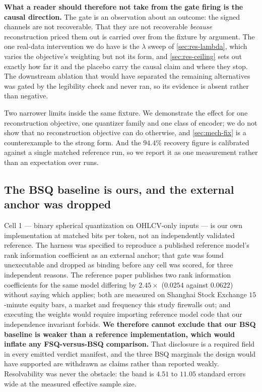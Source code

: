 \textbf{What a reader should therefore not take from the gate firing is the causal direction.} The
gate is an observation about an outcome: the signed channels are not recoverable. That they are not
recoverable \emph{because} reconstruction priced them out is carried over from the fixture by
argument. The one real-data intervention we do have is the $\lambda$ sweep of
\cref{sec:res-lambda}, which varies the objective's weighting but not its form, and
\cref{sec:res-ceiling} sets out exactly how far it and the placebo carry the causal claim and where
they stop. The downstream ablation that would have separated the remaining alternatives was gated
by the legibility check and never ran, so its evidence is absent rather than negative.

Two narrower limits inside the same fixture. We demonstrate the effect for one reconstruction
objective, one quantizer family and one class of encoder; we do not show that no reconstruction
objective can do otherwise, and \cref{sec:mech-fix} is a counterexample to the strong form. And the
$94.4\%$ recovery figure is calibrated against a single matched reference run, so we report it as
one measurement rather than an expectation over runs.

\subsection{The BSQ baseline is ours, and the external anchor was dropped}
\label{sec:lim-baseline}

Cell 1 --- binary spherical quantization on OHLCV-only inputs --- is our own implementation at
matched bits per token, not an independently validated reference. The harness was specified to
reproduce a published reference model's rank information coefficient as an external anchor; that
gate was found unexecutable and dropped as binding before any cell was scored, for three
independent reasons. The reference paper publishes two rank information coefficients for the same
model differing by $2.45\times$ ($0.0254$ against $0.0622$) without saying which applies; both are
measured on Shanghai Stock Exchange $15$-minute equity bars, a market and frequency this study
firewalls out; and executing the weights would require importing reference model code that our
independence invariant forbids. \textbf{We therefore cannot exclude that our BSQ baseline is
weaker than a reference implementation, which would inflate any FSQ-versus-BSQ comparison.} That
disclosure is a required field in every emitted verdict manifest, and the three BSQ marginals the
design would have supported are withdrawn as claims rather than reported weakly. Resolvability was
never the obstacle: the band is $4.51$ to $11.05$ standard errors wide at the measured effective
sample size.


